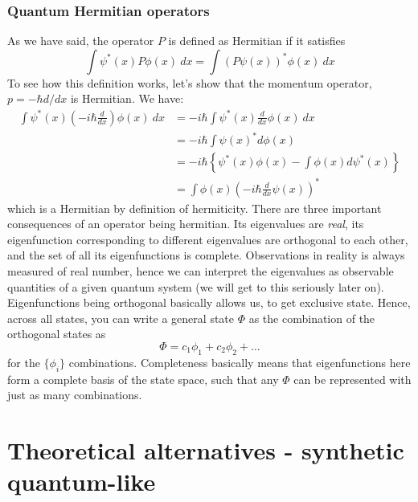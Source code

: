 \subsubsection{Quantum Hermitian operators}
As we have said, the operator $P$ is defined as Hermitian if it satisfies 
\begin{equation}
    \int \psi^{*}(x) P \phi(x) \: dx = \int (P \psi(x))^{*}\phi(x)\: dx
\end{equation}
To see how this definition works, let's show that the momentum operator, $p=-\hbar d/dx$ is Hermitian. We have: 
\begin{align}
    \int \psi^{*}(x) \left(-i\hbar \frac{d}{dx}\right)\phi(x)\: dx 
    & = -i\hbar \int \psi^{*}(x)\frac{d}{dx}\phi(x)\: dx \\
    & = -i\hbar \int \psi(x)^{*} d\phi(x)\\
    & = -i\hbar \left\{ \psi^{*}(x)\phi(x) - \int \phi(x)d\psi^{*}(x) \right\}\\
    & = \int \phi(x)\left(-i\hbar \frac{d}{dx}\psi(x)\right)^{*}
\end{align}
which is a Hermitian by definition of hermiticity. There are three important consequences of an operator being hermitian. Its eigenvalues are \textit{real}, its eigenfunction corresponding to different eigenvalues are orthogonal to each other, and the set of all its eigenfunctions is complete. Observations in reality is always measured of real number, hence we can interpret the eigenvalues as observable quantities of a given quantum system (we will get to this seriously later on). Eigenfunctions being orthogonal basically allows us, to get exclusive state. Hence, across all states, you can write a general state $\Phi$ as the combination of the orthogonal states as 
\begin{equation}
    \Phi = c_{1}\phi_{1} + c_{2}\phi_{2} + \dots 
\end{equation}
for the $\{\phi_{i}\}$ combinations. Completeness basically means that eigenfunctions here form a complete basis of the state space, such that any $\Phi$ can be represented with just as many combinations. 

\clearpage 

\section{Theoretical alternatives - synthetic quantum-like}

